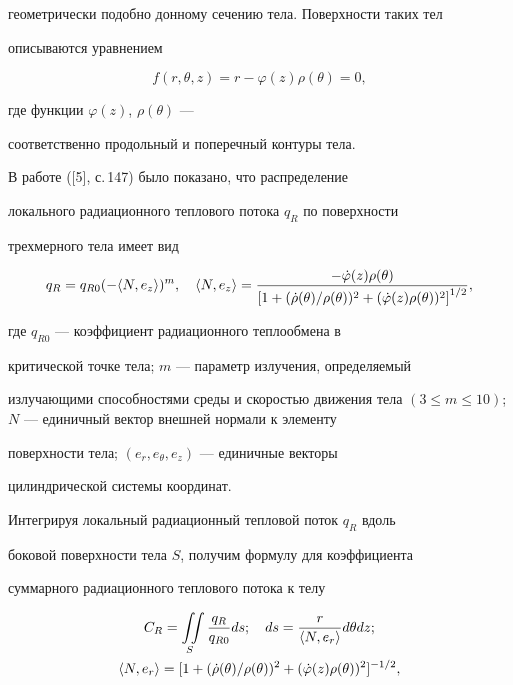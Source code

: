 геометрически подобно донному сечению тела. Поверхности таких тел


описываются уравнением


$$


f(r, \theta, z) = r - \varphi (z) \rho (\theta) = 0,


$$


где функции $\varphi (z)$, $\rho (\theta)$ ---


соответственно продольный и поперечный контуры тела.





В работе ([5], с.\,147) было показано, что распределение


локального радиационного теплового потока $q_R$ по поверхности


трехмерного тела имеет вид


$$ 


q_R = q_{R0} ( - \la N, e_z\ra )^m, \quad


\la N, e_z\ra =


\frac{- \Dot{\varphi} (z) \rho (\theta)} {\left[ 1 + ( \Dot{\rho} (\theta) /


\rho (\theta) )^2 + ( \Dot{\varphi} (z) \rho (\theta) )^2


\right]^{1/2}},


$$


где $q_{R0}$ --- коэффициент радиационного теплообмена в


критической точке тела; $m$ --- параметр излучения, определяемый


излучающими способностями среды и скоростью движения тела $(3\le m \le


10)$; $N$ --- единичный вектор внешней нормали к элементу


поверхности тела; $(e_r, e_{\theta}, e_z)$ --- единичные векторы


цилиндрической системы координат.





Интегрируя локальный радиационный тепловой поток $q_R$ вдоль


боковой поверхности тела $S$, получим формулу для коэффициента


суммарного радиационного теплового потока к телу


\begin{gather*}


C_R = \iint\limits_{S} \frac{q_R} { q_{R0}}  ds; \quad


ds = \frac {r} {\la N, e_r \ra} d\theta dz;\\


\la N, e_r \ra =


[ 1 + ( \Dot{\rho} (\theta) /


\rho (\theta) )^2 + ( \Dot{\varphi} (z) \rho (\theta) )^2


]^{-1/2},


\end{gather*}


